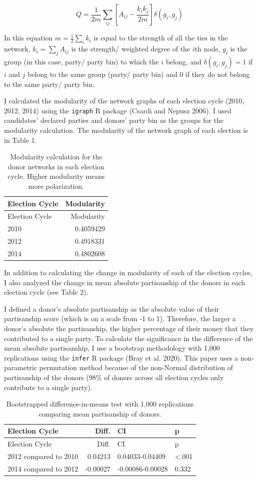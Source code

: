 \documentclass[12pt,]{article}
\begin{document}
\[Q = \frac{1}{2m} \sum_{ij}\left[A_{ij} - \frac{k_{i}k_{j}}{2m} \right]\delta(g_{i},g_{j})\]

In this equation \(m = \frac{1}{2}\sum_{i}k_{i}\) is equal to the
strength of all the ties in the network, \(k_{i}=\sum_{j}A_{ij}\) is the
strength/ weighted degree of the \(i\)th node, \(g_{i}\) is the group
(in this case, party/ party bin) to which the \(i\) belong, and
\(\delta(g_{i},g_{j}) = 1\) if \(i\) and \(j\) belong to the same group
(party/ party bin) and 0 if they do not belong to the same party/ party
bin.

I calculated the modularity of the network graphs of each election cycle
(2010, 2012, 2014) using the \texttt{igraph} R package (Csardi and
Nepusz 2006). I used candidates' declared parties and donors' party bin
as the groups for the modularity calculation. The modularity of the
network graph of each election is in Table 1.

\begin{longtable}[]{@{}lr@{}}
\caption{Modularity calculation for the donor networks in each election
cycle. Higher modularity means more polarization.}\tabularnewline
\toprule
Election Cycle & Modularity\tabularnewline
\midrule
\endfirsthead
\toprule
Election Cycle & Modularity\tabularnewline
\midrule
\endhead
2010 & 0.4059429\tabularnewline
2012 & 0.4918331\tabularnewline
2014 & 0.4802608\tabularnewline
\bottomrule
\end{longtable}

In addition to calculating the change in modularity of each of the
election cycles, I also analyzed the change in mean absolute
partisanship of the donors in each election cycle (see Table 2).

I defined a donor's absolute partisanship as the absolute value of their
partisanship score (which is on a scale from -1 to 1). Therefore, the
larger a donor's absolute the partisanship, the higher percentage of
their money that they contributed to a single party. To calculate the
significance in the difference of the mean absolute partisanship, I use
a bootstrap methodology with 1,000 replications using the \texttt{infer}
R package (Bray et al. 2020). This paper uses a non-parametric
permutation method because of the non-Normal distribution of
partisanship of the donors (98\% of donors across all election cycles
only contribute to a single party).

\begin{longtable}[]{@{}lrll@{}}
\caption{Bootstrapped difference-in-means test with 1,000 replications
comparing mean partisanship of donors.}\tabularnewline
\toprule
Election Cycle & Diff. & CI & p\tabularnewline
\midrule
\endfirsthead
\toprule
Election Cycle & Diff. & CI & p\tabularnewline
\midrule
\endhead
2012 compared to 2010 & 0.04213 & 0.04033-0.04409 &
\textless.001\tabularnewline
2014 compared to 2012 & -0.00027 & -0.00086-0.00028 &
0.332\tabularnewline
\bottomrule
\end{longtable}
\end{document}
